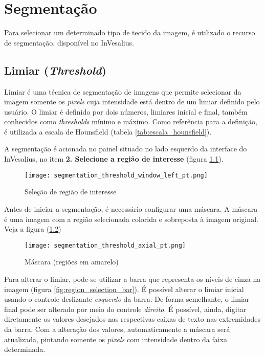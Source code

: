 \chapter{Segmentação}

Para selecionar um determinado tipo de tecido da imagem, é utilizado o recurso de 
segmentação, disponível no InVesalius.

\section{Limiar (\textit{Threshold})}

Limiar é uma técnica de segmentação de imagens que permite selecionar da imagem somente
os \textit{pixels} cuja intensidade está dentro de um limiar definido pelo usuário.
O limiar é definido por dois números, limiares inicial e final, também conhecidos como
\textit{thresholds} mínimo e máximo. Como referência para a definição, é utilizada a
escala de Hounsfield (tabela \ref{tab:escala_hounsfield}).

A segmentação é acionada no painel situado no lado esquerdo da interface do InVesalius,
no item \textbf{2. Selecione a região de interesse} (figura \ref{fig:region_selection}).

\begin{figure}[!htb]
\centering
\texttt{[image: segmentation\_threshold\_window\_left\_pt.png]}
\caption{Seleção de região de interesse}
\label{fig:region_selection}
\end{figure}

Antes de iniciar a segmentação, é necessário configurar uma máscara. A máscara é uma
imagem com a região selecionada colorida e sobreposta à imagem original. Veja a figura
(\ref{fig:region_selection_masc})

\begin{figure}[!htb]
\centering
\texttt{[image: segmentation\_threshold\_axial\_pt.png]}
\caption{Máscara (regiões em amarelo)}
\label{fig:region_selection_masc}
\end{figure}

Para alterar o limiar, pode-se utilizar a barra que representa os níveis de cinza na imagem (figura
\ref{fig:region_selection_bar}). É possível alterar o limiar inicial usando o controle deslizante
\textit{esquerdo} da barra. De forma semelhante, o limiar final pode ser alterado por meio do controle
\textit{direito}. É possível, ainda, digitar diretamente os valores desejados nas respectivas caixas
de texto nas extremidades da barra. Com a alteração dos valores, automaticamente a máscara será atualizada,
pintando somente os \textit{pixels} com intensidade dentro da faixa determinada.

